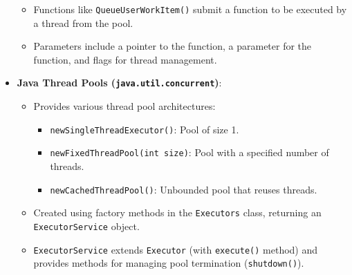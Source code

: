 \begin{itemize}
\begin{itemize}
            \item Functions like \texttt{QueueUserWorkItem()} submit a function to be executed by a thread from the pool.
            \item Parameters include a pointer to the function, a parameter for the function, and flags for thread management.
        \end{itemize}
    \item \textbf{Java Thread Pools (\texttt{java.util.concurrent})}:
        \begin{itemize}
            \item Provides various thread pool architectures:
                \begin{itemize}
                    \item \texttt{newSingleThreadExecutor()}: Pool of size 1.
                    \item \texttt{newFixedThreadPool(int size)}: Pool with a specified number of threads.
                    \item \texttt{newCachedThreadPool()}: Unbounded pool that reuses threads.
                \end{itemize}
            \item Created using factory methods in the \texttt{Executors} class, returning an \texttt{ExecutorService} object.
            \item \texttt{ExecutorService} extends \texttt{Executor} (with \texttt{execute()} method) and provides methods for managing pool termination (\texttt{shutdown()}).
        \end{itemize}
\end{itemize}

